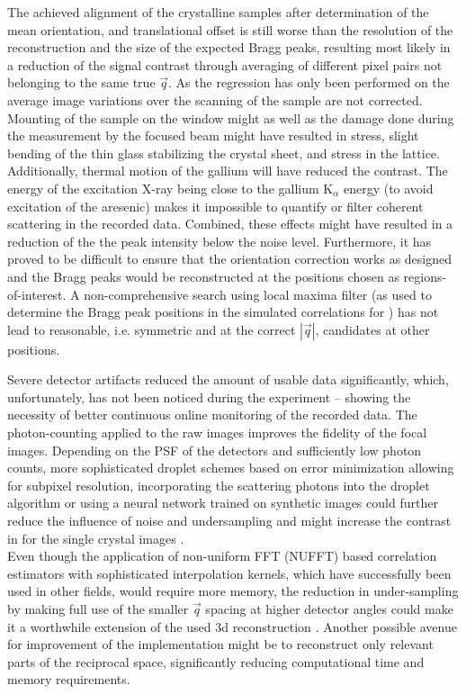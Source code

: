 The achieved alignment of the crystalline samples after determination of the mean orientation, and translational offset is still worse than the resolution of the reconstruction and the size of the expected Bragg peaks, resulting most likely in a reduction of the signal contrast through averaging of different pixel pairs not belonging to the same true $\vec{q}$. As the regression has only been performed on the average image variations over the scanning of the sample are not corrected. Mounting of the sample on the window might as well as the damage done during the measurement by the focused beam might have resulted in stress, slight bending of the thin glass stabilizing the crystal sheet, and stress in the lattice. Additionally, thermal motion of the gallium will have reduced the contrast. The energy of the excitation X-ray being close to the gallium K$_\alpha$ energy (to avoid excitation of the aresenic) makes it impossible to quantify or filter coherent scattering in the recorded data. Combined, these effects might have resulted in a reduction of the the peak intensity below the noise level. Furthermore, it has proved to be difficult to ensure that the orientation correction works as designed and the Bragg peaks would be reconstructed at the positions chosen as regions-of-interest. A non-comprehensive search using local maxima filter (as used to determine the Bragg peak positions in the simulated correlations for ) has not lead to reasonable, i.e. symmetric and at the correct $\left|\vec{q}\right|$, candidates at other positions.

Severe detector artifacts reduced the amount of usable data significantly, which, unfortunately, has not been noticed during the experiment -- showing the necessity of better continuous online monitoring of the recorded data. The photon-counting applied to the raw images improves the fidelity of the focal images. Depending on the PSF of the detectors and sufficiently low photon counts, more sophisticated droplet schemes based on error minimization allowing for subpixel resolution, incorporating the scattering photons into the droplet algorithm or using a neural network trained on synthetic images could further reduce the influence of noise and undersampling and might increase the contrast in for the single crystal images \cite{baumann2018,collaboration2014,schayck2020,sun2020}.\\
Even though the application of non-uniform FFT (NUFFT) based correlation estimators with sophisticated interpolation kernels, which have successfully been used in other fields, would require more memory, the reduction in under-sampling by making full use of the smaller $\vec{q}$ spacing at higher detector angles could make it a worthwhile extension of the used 3d reconstruction \cite{laguna1998,yang2008,chang2020}. Another possible avenue for improvement of the implementation might be to reconstruct only relevant parts of the reciprocal space, significantly reducing computational time and memory requirements. 

